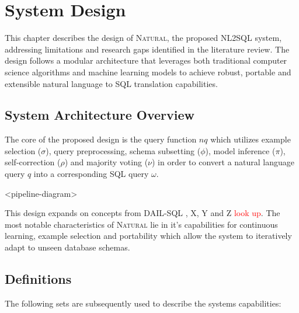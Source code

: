 


















\newpage

\section{System Design}

This chapter describes the design of \textsc{Natural}, the proposed NL2SQL system, 
addressing limitations and research gaps identified in the literature review.
The design follows a modular architecture that leverages both traditional computer
science algorithms and machine learning models to achieve robust, portable and
extensible natural language to SQL translation capabilities.

\subsection{System Architecture Overview}

The core of the proposed design is the query function $nq$ which utilizes
example selection ($\sigma$), query preprocessing, schema subsetting ($\phi$),
model inference ($\pi$), self-correction ($\rho$) and majority voting ($\nu$)
in order to convert a natural language query $q$ into a corresponding SQL query $\omega$.

<pipeline-diagram>
%

This design expands on concepts from DAIL-SQL \citep{DAIL}, X, Y and Z \textcolor{red}{look up}.
The most notable characteristics of \textsc{Natural} lie in it's capabilities for continuous
learning, example selection and portability which allow the system to iteratively
adapt to unseen database schemas.

\subsection{Definitions}

The following sets are subsequently used to describe the systems capabilities: 

